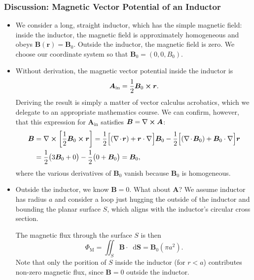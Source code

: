 \documentclass[11pt, a4paper]{article}
\newcommand{\diff}{\mathop{}\!\mathrm{d}} %
\renewcommand{\vec}[1]{\bm{#1}} %
\renewcommand{\r}{\vec{r}}
\newcommand{\B}{\vec{B}} %
\newcommand{\A}{\vec{A}} %
\renewcommand{\div}{\nabla \mspace{-2mu} \cdot \mspace{-2mu}}
\renewcommand{\curl}{\nabla \cross}
\renewcommand{\grad}{\nabla}
\begin{document}
\subsubsection{Discussion: Magnetic Vector Potential of an Inductor}
\begin{itemize}
    \item We consider a long, straight inductor, which has the simple magnetic field: inside the inductor, the magnetic field is approximately homogeneous and obeys $ \B(\r) = \B_{0} $. Outside the inductor, the magnetic field is zero. We choose our coordinate system so that $ \B_{0} = (0, 0, B_{0}) $. 
	
	\item Without derivation, the magnetic vector potential inside the inductor is
	\begin{equation*}
		\A_{\text{in}} = \frac{1}{2}\B_{0} \cross \r.
	\end{equation*}
    Deriving the result is simply a matter of vector calculus acrobatics, which we delegate to an appropriate mathematics course. We can confirm, however, that this expression for $ \A_{\text{in}} $ satisfies $ \B = \curl \A $:
    \begin{align*}
        \B &= \curl \left[ \frac{1}{2} \B_{0} \cross \r \right] = \frac{1}{2}\Big[ (\div \r) + \r \cdot \grad \Big] \B_{0} - \frac{1}{2} \Big[ (\div \B_{0}) + \B_{0} \cdot \grad \Big] \r\\
        & = \frac{1}{2} \big( 3\B_{0} + 0 \big) - \frac{1}{2} \big( 0 + \B_{0} \big) = \B_{0},
    \end{align*}
    where the various derivatives of $ \B_{0} $ vanish because $ \B_{0} $ is homogeneous.
    
	
	\item Outside the inductor, we know $ \B = 0 $. What about $ \A $? We assume inductor has radius $ a $ and consider a loop just hugging the outside of the inductor and bounding the planar surface $ S $, which aligns with the inductor's circular cross section.
	
	The magnetic flux through the surface $ S $ is then
	\begin{equation*}
		\Phi_{\text{M}} = \iint_{S} \B \cdot \diff \vec{S} = \B_{0} (\pi a^{2}).
	\end{equation*}
    Note that only the porition of $ S $ inside the inductor (for $ r < a $) contributes non-zero magnetic flux, since $ \B = 0 $ outside the inductor.
	

\end{itemize}
\end{document}
